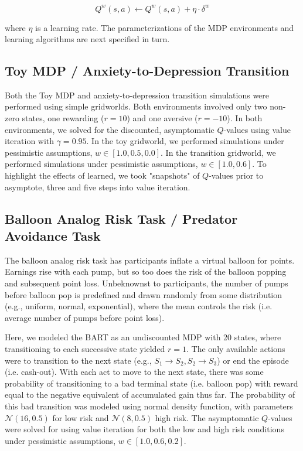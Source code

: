 \documentclass[manuscript]{stjour}
\begin{document}
\begin{equation*}
Q^w(s,a) \leftarrow Q^w(s,a) + \eta \cdot \delta^w
\end{equation*}

where $\eta$ is a learning rate. The parameterizations of the MDP environments and learning algorithms are next specified in turn.

\subsection{Toy MDP / Anxiety-to-Depression Transition}
Both the Toy MDP and anxiety-to-depression transition simulations were performed using simple gridworlds. Both environments involved only two non-zero states, one rewarding ($r=10$) and one aversive ($r=-10$). In both environments, we solved for the discounted, asymptomatic $Q$-values using value iteration with $\gamma = 0.95$. In the toy gridworld, we performed simulations under pessimistic assumptions, $w \in [1.0, 0.5, 0.0]$. In the transition gridworld, we performed simulations under pessimistic assumptions, $w \in [1.0, 0.6]$. To highlight the effects of learned, we took "snapshots" of $Q$-values prior to asymptote, three and five steps into value iteration. 

\subsection{Balloon Analog Risk Task / Predator Avoidance Task}
The balloon analog risk task \citep{Lejuez2002} has participants inflate a virtual balloon for points. Earnings rise with each pump, but so too does the risk of the balloon popping and subsequent point loss. Unbeknownst to participants, the number of pumps before balloon pop is predefined and drawn randomly from some distribution (e.g., uniform, normal, exponential), where the mean controls the risk (i.e. average number of pumps before point loss). 

Here, we modeled the BART as an undiscounted MDP with 20 states, where transitioning to each successive state yielded $r=1$. The only available actions were to transition to the next state (e.g., $S_1 \rightarrow S_2, S_2 \rightarrow S_3$) or end the episode (i.e. cash-out). With each act to move to the next state, there was some probability of transitioning to a bad terminal state (i.e. balloon pop) with reward equal to the negative equivalent of accumulated gain thus far. The probability of this bad transition was modeled using normal density function, with parameters $\mathcal{N}(16,0.5)$ for low risk and $\mathcal{N}(8,0.5)$ high risk. The asymptomatic $Q$-values were solved for using value iteration for both the low and high risk conditions under pessimistic assumptions, $w \in [1.0, 0.6, 0.2]$.
\end{document}

